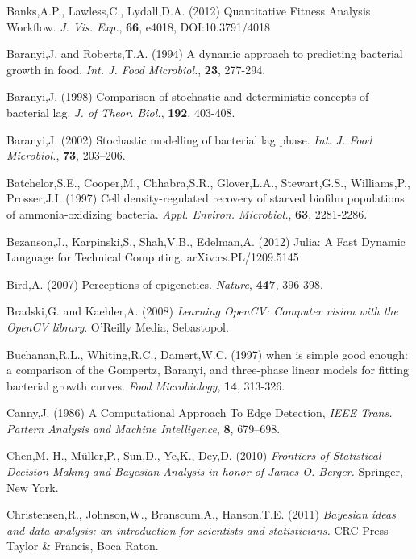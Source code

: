 \documentclass{bioinfo}
\begin{document}
{\begin{thebibliography}{}
Banks,A.P., Lawless,C., Lydall,D.A. (2012) Quantitative Fitness Analysis Workflow. \textit{J. Vis. Exp.}, \textbf{66}, e4018, DOI:10.3791/4018

Baranyi,J. and Roberts,T.A. (1994) A dynamic approach to predicting bacterial growth in food. {\it Int. J. Food Microbiol.}, {\bf 23}, 277-294.

 Baranyi,J. (1998) Comparison of stochastic and deterministic concepts of bacterial lag. {\it J. of Theor. Biol.}, {\bf 192}, 403-408. 

Baranyi,J. (2002) Stochastic modelling of bacterial lag phase. {\it Int. J. Food Microbiol.}, {\bf 73}, 203–206.

Batchelor,S.E., Cooper,M., Chhabra,S.R., Glover,L.A., Stewart,G.S., Williams,P., Prosser,J.I. (1997) Cell density-regulated recovery of starved biofilm populations of ammonia-oxidizing bacteria. \textit{Appl. Environ. Microbiol.}, \textbf{63}, 2281-2286. 

Bezanson,J., Karpinski,S., Shah,V.B., Edelman,A. (2012) Julia: A Fast Dynamic Language for Technical Computing. arXiv:cs.PL/1209.5145

Bird,A. (2007) Perceptions of epigenetics. {\it Nature}, {\bf 447}, 396-398.

Bradski,G. and Kaehler,A. (2008) \textit{Learning OpenCV: Computer vision with the OpenCV library}. O'Reilly Media, Sebastopol.

Buchanan,R.L., Whiting,R.C., Damert,W.C. (1997) when is simple good enough: a comparison of the Gompertz, Baranyi, and three-phase linear models for fitting bacterial growth curves. \textit{Food Microbiology}, \textbf{14}, 313-326.

Canny,J. (1986) A Computational Approach To Edge Detection, \textit{IEEE Trans. Pattern Analysis and Machine Intelligence}, \textbf{8}, 679–698.

Chen,M.-H., M\"{ü}ller,P., Sun,D., Ye,K., Dey,D. (2010) \textit{Frontiers of Statistical Decision Making and Bayesian Analysis in honor of James O. Berger.}
Springer, New York.

 Christensen,R., Johnson,W., Branscum,A., Hanson.T.E. (2011) {\it Bayesian ideas and data analysis: an introduction for scientists and statisticians.} CRC Press Taylor \& Francis, Boca Raton.


\end{thebibliography}}
\end{document}
